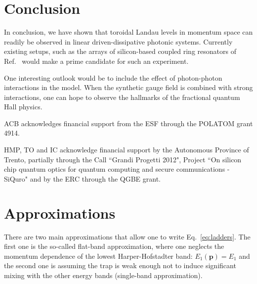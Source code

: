 \documentclass[twocolumn, 10pt, aps, superscriptaddress, floatfix, showpacs, pra, citeautoscript]{revtex4-1}
\newcommand{\vt}[1]{\mathbf{#1}}
\newcommand{\co}[2]{#2}
\renewcommand{\paragraph}{\co}
\begin{document}
\section{Conclusion}
\label{sec:conclusion}


In conclusion, we have shown that toroidal Landau levels in momentum
space can readily be observed in linear driven-dissipative photonic
systems. Currently existing setups, such as the arrays of
silicon-based coupled ring resonators of
Ref.~ would make a prime candidate for
such an experiment.

\paragraph{One possible outlook is to include interactions.}
One interesting outlook would be to include the effect of photon-photon interactions in the model. When the synthetic gauge field is combined with strong interactions, one can hope to observe the hallmarks of the fractional quantum Hall physics.


\acknowledgments

ACB acknowledges financial support from the ESF through the POLATOM grant 4914.

HMP, TO and IC acknowledge financial support by the Autonomous Province of Trento, partially through the Call ``Grandi Progetti 2012", Project ``On silicon chip quantum optics for quantum computing and secure communications - SiQuro" and by the ERC through the QGBE grant.





\appendix

\section{Approximations}\label{app:approximations}


\paragraph{There are two main approximations in Hannah's paper.}
There are two main approximations that allow one to write
Eq.~\eqref{eq:ladders}. The first one is the so-called flat-band
approximation, where one neglects the momentum dependence of the
lowest Harper-Hofstadter band: $E_1(\vt{p}) = E_1$ and the second one is
assuming the trap is weak enough not to induce significant mixing with
the other energy bands (single-band approximation).
\end{document}
